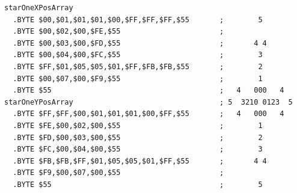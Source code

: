 \begin{lstlisting}[caption=Source code for the Star.]
starOneXPosArray  
  .BYTE $00,$01,$01,$01,$00,$FF,$FF,$FF,$55       ;        5       
  .BYTE $00,$02,$00,$FE,$55                       ;                
  .BYTE $00,$03,$00,$FD,$55                       ;       4 4      
  .BYTE $00,$04,$00,$FC,$55                       ;        3       
  .BYTE $FF,$01,$05,$05,$01,$FF,$FB,$FB,$55       ;        2       
  .BYTE $00,$07,$00,$F9,$55                       ;        1       
  .BYTE $55                                       ;   4   000   4  
starOneYPosArray                                  ; 5  3210 0123  5  
  .BYTE $FF,$FF,$00,$01,$01,$01,$00,$FF,$55       ;   4   000   4  
  .BYTE $FE,$00,$02,$00,$55                       ;        1       
  .BYTE $FD,$00,$03,$00,$55                       ;        2       
  .BYTE $FC,$00,$04,$00,$55                       ;        3       
  .BYTE $FB,$FB,$FF,$01,$05,$05,$01,$FF,$55       ;       4 4      
  .BYTE $F9,$00,$07,$00,$55                       ;                
  .BYTE $55                                       ;        5       
\end{lstlisting}




